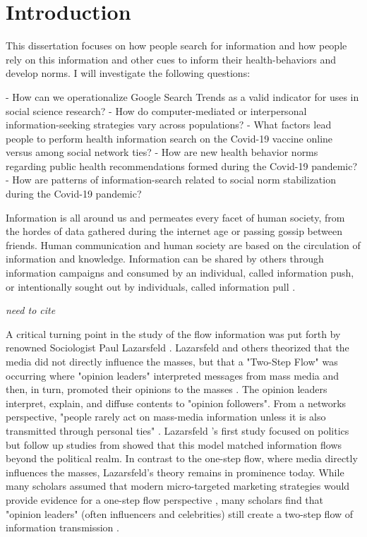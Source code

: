\hypertarget{intro}{%
\chapter{Introduction}\label{intro}}


This dissertation focuses on how people search for information and how
people rely on this information and other cues to inform their
health-behaviors and develop norms. I will investigate the following
questions: 

- How can we operationalize Google Search Trends as a valid indicator for uses in social science research?    
- How do computer-mediated or interpersonal information-seeking strategies vary
across populations?
- What factors lead people to perform health information search on the Covid-19 vaccine online versus among social network ties? 
- How are new health behavior norms regarding public health recommendations formed during the Covid-19 pandemic?  
- How are patterns of information-search related to social norm stabilization during the Covid-19 pandemic?  

Information is all around us and permeates every facet of human society,
from the hordes of data gathered during the internet age or passing
gossip between friends. Human communication and human society are based
on the circulation of information and knowledge. Information can be
shared by others through information campaigns and consumed by an
individual, called information push, or intentionally sought out by
individuals, called information pull \citep{cybenkoFoundationsInformationPush1999}.

\emph{need to cite \citep{bayer_etal20, bossetta18}}

A critical turning point in the study of the flow information was put forth by renowned Sociologist Paul Lazarsfeld \citeyearpar{lazarsfeldPeopleChoice1944}. Lazarsfeld and others theorized that the media did not directly influence the masses, but that a "Two-Step Flow" was occurring where "opinion leaders" interpreted messages from mass media and then, in turn, promoted their opinions to the masses \citep{katzPersonalInfluencePart1955}. The opinion leaders interpret, explain, and diffuse contents to "opinion followers". From a networks
perspective, "people rarely act on mass-media information unless it is also transmitted through personal ties" \citep[p. 1374]{granovetterStrengthWeakTies1973}. Lazarsfeld  \citeyearpar{lazarsfeldPeopleChoice1944}'s first study focused on politics but follow up studies from \citep{katzPersonalInfluencePart1955} showed that this model matched information flows beyond the political realm. In contrast to the one-step flow, where media directly influences the masses, Lazarsfeld's theory remains in prominence today. While many scholars assumed that modern micro-targeted marketing strategies would provide evidence for a one-step flow perspective \citep{bennettOneStepFlowCommunication2006}, many scholars find that "opinion leaders" (often influencers and celebrities) still create a two-step flow of information transmission \citep{choi15, hilbertOneStepTwo2017}.

